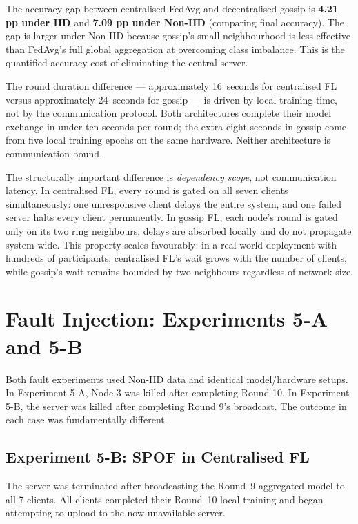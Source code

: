 \documentclass[12pt]{report}
\begin{document}
The accuracy gap between centralised FedAvg and decentralised gossip is
\textbf{4.21 pp under IID} and \textbf{7.09 pp under Non-IID} (comparing
final accuracy). The gap is larger under Non-IID because gossip's small
neighbourhood is less effective than FedAvg's full global aggregation at
overcoming class imbalance. This is the quantified accuracy cost of
eliminating the central server.

The round duration difference --- approximately 16~seconds for centralised FL
versus approximately 24~seconds for gossip --- is driven by local training
time, not by the communication protocol. Both architectures complete their
model exchange in under ten seconds per round; the extra eight seconds in
gossip come from five local training epochs on the same hardware. Neither
architecture is communication-bound.

The structurally important difference is \emph{dependency scope}, not
communication latency. In centralised FL, every round is gated on all seven
clients simultaneously: one unresponsive client delays the entire system, and
one failed server halts every client permanently. In gossip FL, each node's
round is gated only on its two ring neighbours; delays are absorbed locally
and do not propagate system-wide. This property scales favourably: in a
real-world deployment with hundreds of participants, centralised FL's wait
grows with the number of clients, while gossip's wait remains bounded by two
neighbours regardless of network size.

\section{Fault Injection: Experiments 5-A and 5-B}
\label{sec:fault-results}

Both fault experiments used Non-IID data and identical model/hardware setups.
In Experiment 5-A, Node 3 was killed after completing Round 10. In Experiment
5-B, the server was killed after completing Round 9's broadcast. The outcome
in each case was fundamentally different.

\subsection{Experiment 5-B: SPOF in Centralised FL}

The server was terminated after broadcasting the Round~9 aggregated model to all
7 clients. All clients completed their Round~10 local training and began
attempting to upload to the now-unavailable server.
\end{document}
